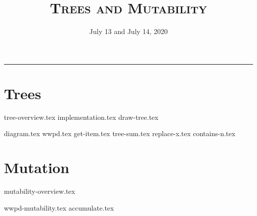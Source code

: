 \documentclass{exam}
\title{\textsc{Trees and Mutability}}
\date{July 13 and July 14, 2020}
\begin{document}
\maketitle
\rule{\textwidth}{0.15em}
\fontsize{12}{15}\selectfont

\section{Trees}
{tree-overview.tex}
{implementation.tex}
{draw-tree.tex}
\newpage
\begin{questions}
{diagram.tex}
{wwpd.tex}
\vspace{2\baselineskip}
{get-item.tex}
{tree-sum.tex}
{replace-x.tex}
{contains-n.tex}
\end{questions}

\newpage
\section{Mutation}
{mutability-overview.tex} 
\newpage
\begin{questions}
{wwpd-mutability.tex}
\newpage
{accumulate.tex}
\end{questions}
\end{document}
